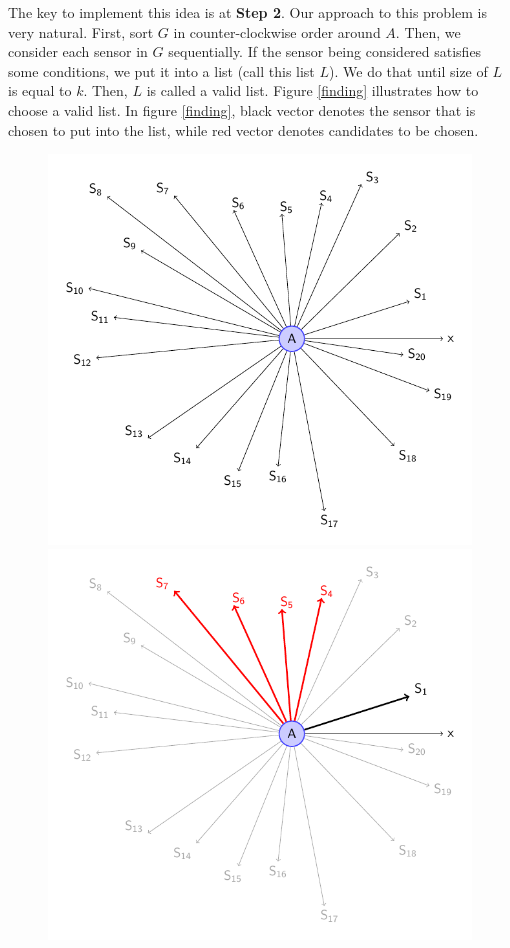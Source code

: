 The key to implement this idea is at {\bfseries Step 2}. Our approach to this problem is very natural. First, sort $G$ in counter-clockwise order around $A$. Then, we consider each sensor in $G$ sequentially. If the sensor being considered satisfies some conditions, we put it into a list (call this list $L$). We do that until size of $L$ is equal to $k$. Then, $L$ is called a valid list. Figure \ref{finding} illustrates how to choose a valid list. In figure \ref{finding}, black vector denotes the sensor that is chosen to put into the list, while red vector denotes candidates to be chosen.

\begin{figure}[!h]
	\begin{minipage}{.3\linewidth}
		\includegraphics[scale=.5]{setSensors_1.pdf}
	\end{minipage}
	\hfill
	\begin{minipage}{.3\linewidth}
		\includegraphics[scale=.5]{setSensors_2.pdf}

\end{minipage}
\end{figure}
